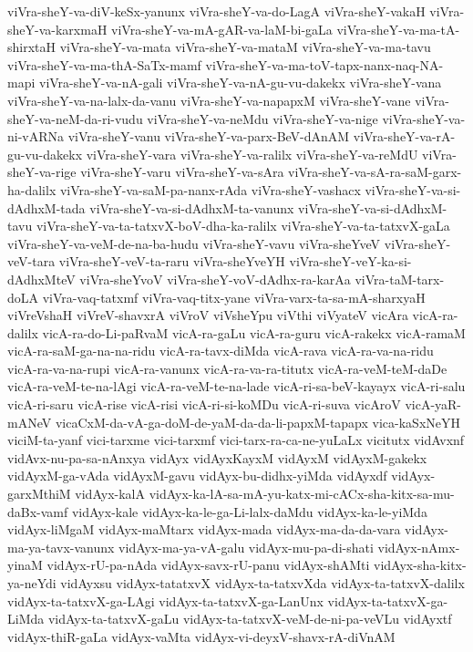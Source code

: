 {viVra-sheY-va-diV-keSx-yanunx
viVra-sheY-va-do-LagA
viVra-sheY-vakaH
viVra-sheY-va-karxmaH
viVra-sheY-va-mA-gAR-va-laM-bi-gaLa
viVra-sheY-va-ma-tA-shirxtaH
viVra-sheY-va-mata
viVra-sheY-va-mataM
viVra-sheY-va-ma-tavu
viVra-sheY-va-ma-thA-SaTx-mamf
viVra-sheY-va-ma-toV-tapx-nanx-naq-NA-mapi
viVra-sheY-va-nA-gali
viVra-sheY-va-nA-gu-vu-dakekx
viVra-sheY-vana
viVra-sheY-va-na-lalx-da-vanu
viVra-sheY-va-napapxM
viVra-sheY-vane
viVra-sheY-va-neM-da-ri-vudu
viVra-sheY-va-neMdu
viVra-sheY-va-nige
viVra-sheY-va-ni-vARNa
viVra-sheY-vanu
viVra-sheY-va-parx-BeV-dAnAM
viVra-sheY-va-rA-gu-vu-dakekx
viVra-sheY-vara
viVra-sheY-va-ralilx
viVra-sheY-va-reMdU
viVra-sheY-va-rige
viVra-sheY-varu
viVra-sheY-va-sAra
viVra-sheY-va-sA-ra-saM-garx-ha-dalilx
viVra-sheY-va-saM-pa-nanx-rAda
viVra-sheY-vashacx
viVra-sheY-va-si-dAdhxM-tada
viVra-sheY-va-si-dAdhxM-ta-vanunx
viVra-sheY-va-si-dAdhxM-tavu
viVra-sheY-va-ta-tatxvX-boV-dha-ka-ralilx
viVra-sheY-va-ta-tatxvX-gaLa
viVra-sheY-va-veM-de-na-ba-hudu
viVra-sheY-vavu
viVra-sheYveV
viVra-sheY-veV-tara
viVra-sheY-veV-ta-raru
viVra-sheYveYH
viVra-sheY-veY-ka-si-dAdhxMteV
viVra-sheYvoV
viVra-sheY-voV-dAdhx-ra-karAa
viVra-taM-tarx-doLA
viVra-vaq-tatxmf
viVra-vaq-titx-yane
viVra-varx-ta-sa-mA-sharxyaH
viVreVshaH
viVreV-shavxrA
viVroV
viVsheYpu
viVthi
viVyateV
vicAra
vicA-ra-dalilx
vicA-ra-do-Li-paRvaM
vicA-ra-gaLu
vicA-ra-guru
vicA-rakekx
vicA-ramaM
vicA-ra-saM-ga-na-na-ridu
vicA-ra-tavx-diMda
vicA-rava
vicA-ra-va-na-ridu
vicA-ra-va-na-rupi
vicA-ra-vanunx
vicA-ra-va-ra-titutx
vicA-ra-veM-teM-daDe
vicA-ra-veM-te-na-lAgi
vicA-ra-veM-te-na-lade
vicA-ri-sa-beV-kayayx
vicA-ri-salu
vicA-ri-saru
vicA-rise
vicA-risi
vicA-ri-si-koMDu
vicA-ri-suva
vicAroV
vicA-yaR-mANeV
vicaCxM-da-vA-ga-doM-de-yaM-da-da-li-papxM-tapapx
vica-kaSxNeYH
viciM-ta-yanf
vici-tarxme
vici-tarxmf
vici-tarx-ra-ca-ne-yuLaLx
vicitutx
vidAvxnf
vidAvx-nu-pa-sa-nAnxya
vidAyx
vidAyxKayxM
vidAyxM
vidAyxM-gakekx
vidAyxM-ga-vAda
vidAyxM-gavu
vidAyx-bu-didhx-yiMda
vidAyxdf
vidAyx-garxMthiM
vidAyx-kalA
vidAyx-ka-lA-sa-mA-yu-katx-mi-cACx-sha-kitx-sa-mu-daBx-vamf
vidAyx-kale
vidAyx-ka-le-ga-Li-lalx-daMdu
vidAyx-ka-le-yiMda
vidAyx-liMgaM
vidAyx-maMtarx
vidAyx-mada
vidAyx-ma-da-da-vara
vidAyx-ma-ya-tavx-vanunx
vidAyx-ma-ya-vA-galu
vidAyx-mu-pa-di-shati
vidAyx-nAmx-yinaM
vidAyx-rU-pa-nAda
vidAyx-savx-rU-panu
vidAyx-shAMti
vidAyx-sha-kitx-ya-neYdi
vidAyxsu
vidAyx-tatatxvX
vidAyx-ta-tatxvXda
vidAyx-ta-tatxvX-dalilx
vidAyx-ta-tatxvX-ga-LAgi
vidAyx-ta-tatxvX-ga-LanUnx
vidAyx-ta-tatxvX-ga-LiMda
vidAyx-ta-tatxvX-gaLu
vidAyx-ta-tatxvX-veM-de-ni-pa-veVLu
vidAyxtf
vidAyx-thiR-gaLa
vidAyx-vaMta
vidAyx-vi-deyxV-shavx-rA-diVnAM
}
